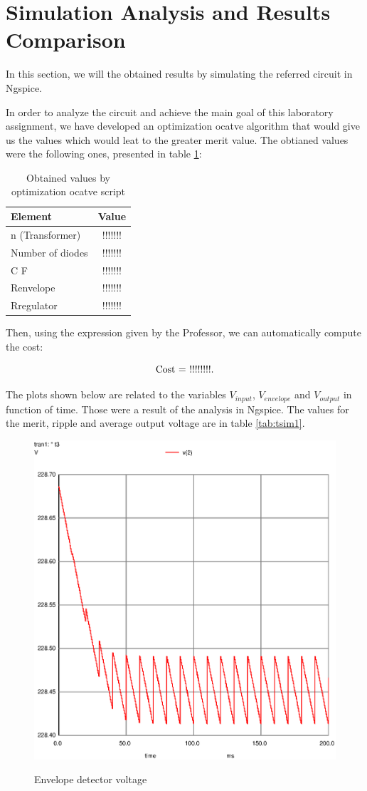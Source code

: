 \newpage
\section{Simulation Analysis and Results Comparison}
\label{sec:simulation}

In this section, we will the obtained results by simulating the referred circuit in Ngspice. 

In order to analyze the circuit and achieve the main goal of this laboratory assignment, we have developed an optimization ocatve algorithm that would give us the values which would leat to the greater merit value. The obtianed values were the following ones, presented in table \ref{tab:vsim1}:

\begin{table}[h]
    \centering
    \begin{tabular}{|l|c|}
    \hline
    {\bf Element } & {\bf Value} \\
    \hline \hline
    n (Transformer) & !!!!!!! \\
    \hline
    Number of diodes & !!!!!!! \\
    \hline
    C F & !!!!!!! \\
    \hline
    Renvelope & !!!!!!! \\
    \hline
    Rregulator  & !!!!!!! \\
    \hline
    \end{tabular}
    \caption{Obtained values by optimization ocatve script}
    \label{tab:vsim1}
\end{table}

Then, using the expression given by the Professor, we can automatically compute the cost: 

\begin{equation}
    $Cost = !!!!!!!!$. %
    \label{eq:Cost}
\end{equation}

The plots shown below are related to the variables $V_{input}$, $V_{envelope}$ and $V_{output}$ in function of time. Those were a result of the analysis in Ngspice. The values for the merit, ripple and average output voltage are in table \ref{tab:tsim1}.

\begin{figure}[!ht] \centering
\caption{Envelope detector voltage}
\includegraphics[width=0.6\linewidth]{venv.eps}
\label{fig:gteo1}
\end{figure}
\newpage

